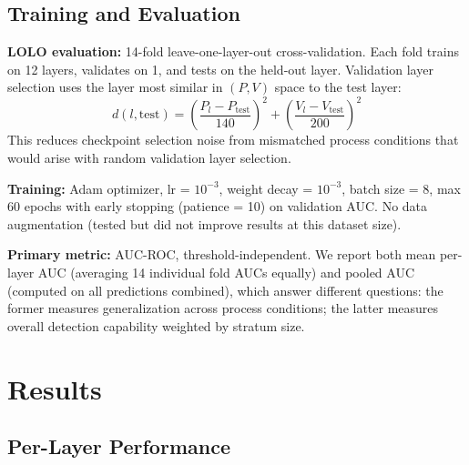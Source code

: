 \documentclass[12pt, letterpaper]{article}
\begin{document}
\subsection{Training and Evaluation}

\textbf{LOLO evaluation:} 14-fold leave-one-layer-out
cross-validation. Each fold trains on 12 layers, validates
on 1, and tests on the held-out layer. Validation layer
selection uses the layer most similar in $(P, V)$ space
to the test layer:
\begin{equation}
d(l, \text{test}) =
\left(\frac{P_l - P_\text{test}}{140}\right)^2 +
\left(\frac{V_l - V_\text{test}}{200}\right)^2
\end{equation}
This reduces checkpoint selection noise from mismatched
process conditions that would arise with random validation
layer selection.

\textbf{Training:} Adam optimizer, lr = $10^{-3}$,
weight decay = $10^{-3}$, batch size = 8, max 60 epochs
with early stopping (patience = 10) on validation AUC.
No data augmentation (tested but did not improve results
at this dataset size).

\textbf{Primary metric:} AUC-ROC, threshold-independent.
We report both mean per-layer AUC (averaging 14 individual
fold AUCs equally) and pooled AUC (computed on all
predictions combined), which answer different questions:
the former measures generalization across process conditions;
the latter measures overall detection capability weighted
by stratum size.

\section{Results}

\subsection{Per-Layer Performance}
\end{document}
